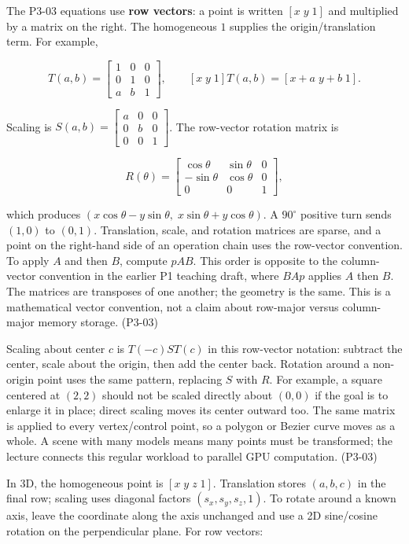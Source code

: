 The P3-03 equations use \textbf{row vectors}: a point is written \([x\;y\;1]\) and multiplied by a matrix on the right. The homogeneous \(1\) supplies the origin/translation term. For example,

\[
T(a,b)=\begin{bmatrix}1&0&0\\0&1&0\\a&b&1\end{bmatrix},\qquad
[x\;y\;1]T(a,b)=[x+a\;y+b\;1].
\]

Scaling is \(S(a,b)=\begin{bmatrix}a&0&0\\0&b&0\\0&0&1\end{bmatrix}\). The row-vector rotation matrix is

\[
R(\theta)=\begin{bmatrix}\cos\theta&\sin\theta&0\\-\sin\theta&\cos\theta&0\\0&0&1\end{bmatrix},
\]

which produces \((x\cos\theta-y\sin\theta,\;x\sin\theta+y\cos\theta)\). A \(90^\circ\) positive turn sends \((1,0)\) to \((0,1)\). Translation, scale, and rotation matrices are sparse, and a point on the right-hand side of an operation chain uses the row-vector convention. To apply \(A\) and then \(B\), compute \(pAB\). This order is opposite to the column-vector convention in the earlier P1 teaching draft, where \(BAp\) applies \(A\) then \(B\). The matrices are transposes of one another; the geometry is the same. This is a mathematical vector convention, not a claim about row-major versus column-major memory storage. (P3-03)

Scaling about center \(c\) is \(T(-c)ST(c)\) in this row-vector notation: subtract the center, scale about the origin, then add the center back. Rotation around a non-origin point uses the same pattern, replacing \(S\) with \(R\). For example, a square centered at \((2,2)\) should not be scaled directly about \((0,0)\) if the goal is to enlarge it in place; direct scaling moves its center outward too. The same matrix is applied to every vertex/control point, so a polygon or Bezier curve moves as a whole. A scene with many models means many points must be transformed; the lecture connects this regular workload to parallel GPU computation. (P3-03)

In 3D, the homogeneous point is \([x\;y\;z\;1]\). Translation stores \((a,b,c)\) in the final row; scaling uses diagonal factors \((s_x,s_y,s_z,1)\). To rotate around a known axis, leave the coordinate along the axis unchanged and use a 2D sine/cosine rotation on the perpendicular plane. For row vectors:

